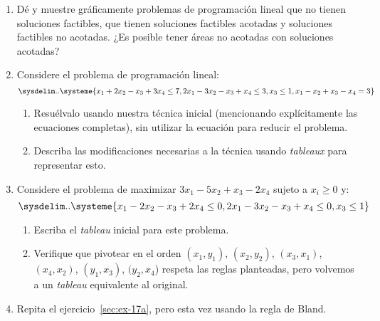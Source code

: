  \begin{enumerate}
  \item
    Dé y muestre gráficamente problemas de programación lineal
    que no tienen soluciones factibles,
    que tienen soluciones factibles acotadas
    y soluciones factibles no acotadas.
    ¿Es posible tener áreas no acotadas con soluciones acotadas?
  \item
    Considere el problema de programación lineal:
    \begin{equation*}
      \sysdelim..
      \systeme{
          x_1 + 2 x_2 - x_3 + 3 x_4 \leq 7,
        2 x_1 - 3 x_2 - x_3 +	x_4 \leq 3,
                        x_3	    \leq 1,
          x_1 - x_2   + x_3 -	x_4 =	 3
      }
    \end{equation*}
    \begin{enumerate}
    \item
      Resuélvalo usando nuestra técnica inicial
      (mencionando explícitamente las ecuaciones completas),
      sin utilizar la ecuación para reducir el problema.
    \item
      Describa las modificaciones necesarias a la técnica
      usando \emph{\foreignlanguage{french}{tableaux}}
      para representar esto.
    \end{enumerate}
  \item
    \label{ex:-17a-cycle}
    Considere el problema
    de maximizar \(3 x_1 - 5 x_2 + x_3 - 2 x_4\) sujeto a \(x_i \ge 0\) y:
    \begin{equation*}
      \sysdelim..
      \systeme{
          x_1 - 2 x_2 - x_3 + 2 x_4 \leq 0,
        2 x_1 - 3 x_2 - x_3 +	x_4 \leq 0,
                        x_3	    \leq 1
      }
    \end{equation*}
    \begin{enumerate}
    \item
      Escriba el \emph{\foreignlanguage{french}{tableau}} inicial
      para este problema.
    \item
      Verifique que
      pivotear en el orden \((x_1, y_1)\),
      \((x_2, y_2)\),
      \((x_3, x_1)\),
      \((x_4, x_2)\),
      \((y_1, x_3)\),
      \((y_2, x_4\))
      respeta las reglas planteadas,
      pero volvemos a un \emph{\foreignlanguage{french}{tableau}}
      equivalente al original.
    \end{enumerate}
  \item
    Repita el ejercicio~\ref{sec:ex-17a},
    pero esta vez usando la regla de Bland.
  \end{enumerate}




